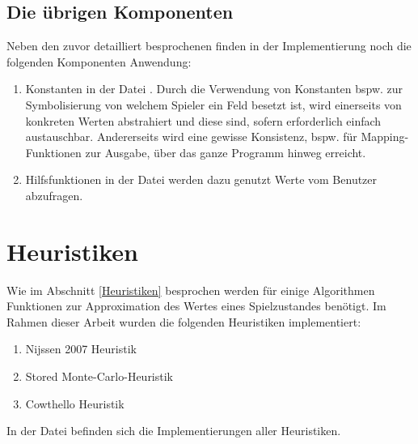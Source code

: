 \subsection{Die übrigen Komponenten}
Neben den zuvor detailliert besprochenen finden in der Implementierung noch die folgenden Komponenten Anwendung: 
\begin{enumerate}
\item Konstanten in der Datei . Durch die Verwendung von Konstanten bspw. zur Symbolisierung von welchem Spieler ein Feld besetzt ist, wird einerseits von konkreten Werten abstrahiert und diese sind, sofern erforderlich einfach austauschbar. Andererseits wird eine gewisse Konsistenz, bspw. für Mapping-Funktionen zur Ausgabe, über das ganze Programm hinweg erreicht.
\item Hilfsfunktionen in der Datei  werden dazu genutzt Werte vom Benutzer abzufragen.
\end{enumerate}
\section{Heuristiken}
\label{heuristic}
Wie im Abschnitt \ref{Heuristiken} besprochen werden für einige Algorithmen Funktionen zur Approximation des Wertes eines Spielzustandes benötigt. Im Rahmen dieser Arbeit wurden die folgenden Heuristiken implementiert:
\begin{enumerate}
\item Nijssen 2007 Heuristik
\item Stored Monte-Carlo-Heuristik
\item Cowthello Heuristik
\end{enumerate}
In der Datei  befinden sich die Implementierungen aller Heuristiken.

